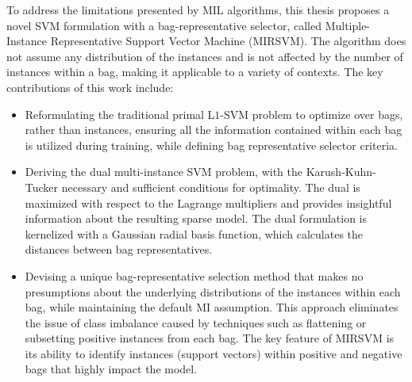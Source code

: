 \documentclass[reqno]{vcuthesis}
\newcommand{\iitem}{\item[-]}
\numberwithin{equation}{chapter}
\begin{document}
To address the limitations presented by MIL algorithms, this thesis proposes a novel SVM formulation with a bag-representative selector, called Multiple-Instance Representative Support Vector Machine (MIRSVM). The algorithm does not assume any distribution of the instances and is not affected by the number of instances within a bag, making it applicable to a variety of contexts. The key contributions of this work include:
\begin{itemize}
\iitem Reformulating the traditional primal L$1$-SVM problem to optimize over bags, rather than instances, ensuring all the information contained within each bag is utilized during training, while defining bag representative selector criteria.

\iitem Deriving the dual multi-instance SVM problem, with the Karush-Kuhn-Tucker necessary and sufficient conditions for optimality. The dual is maximized with respect to the Lagrange multipliers and provides insightful information about the resulting sparse model. The dual formulation is kernelized with a Gaussian radial basis function, which calculates the distances between bag representatives.

\iitem Devising a unique bag-representative selection method that makes no presumptions about the underlying distributions of the instances within each bag, while maintaining the default MI assumption. This approach eliminates the issue of class imbalance caused by techniques such as flattening or subsetting positive instances from each bag. The key feature of MIRSVM is its ability to identify instances (support vectors) within positive and negative bags that highly impact the model.
\end{itemize}
\end{document}
